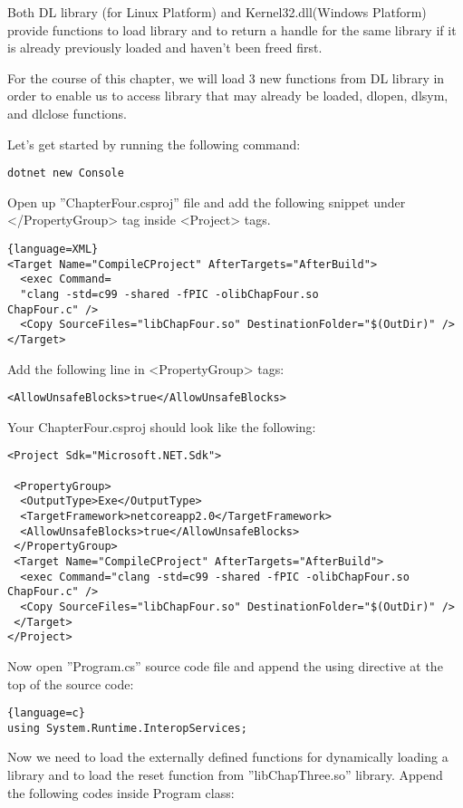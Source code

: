 Both DL library (for Linux Platform) and Kernel32.dll(Windows Platform) provide functions to load library and to return a handle for the same library if it is already previously loaded and haven't been freed first.

For the course of this chapter, we will load 3 new functions from DL library in order to enable us to access library that may already be loaded, dlopen, dlsym, and dlclose functions.

Let's get started by running the following command:

\begin{lstlisting}
dotnet new Console
\end{lstlisting}
\newpage
Open up ''ChapterFour.csproj'' file and add the following snippet under </PropertyGroup> tag inside <Project> tags.

\begin{lstlisting}{language=XML}
<Target Name="CompileCProject" AfterTargets="AfterBuild">
  <exec Command=
  "clang -std=c99 -shared -fPIC -olibChapFour.so
ChapFour.c" />
  <Copy SourceFiles="libChapFour.so" DestinationFolder="$(OutDir)" />
</Target>
\end{lstlisting}

Add the following line in <PropertyGroup> tags:

\begin{lstlisting}
<AllowUnsafeBlocks>true</AllowUnsafeBlocks>
\end{lstlisting}

Your ChapterFour.csproj should look like the following:

\begin{lstlisting}
<Project Sdk="Microsoft.NET.Sdk">

 <PropertyGroup>
  <OutputType>Exe</OutputType>
  <TargetFramework>netcoreapp2.0</TargetFramework>
  <AllowUnsafeBlocks>true</AllowUnsafeBlocks>
 </PropertyGroup>
 <Target Name="CompileCProject" AfterTargets="AfterBuild">
  <exec Command="clang -std=c99 -shared -fPIC -olibChapFour.so
ChapFour.c" />
  <Copy SourceFiles="libChapFour.so" DestinationFolder="$(OutDir)" />
 </Target>
</Project>
\end{lstlisting}
Now open ''Program.cs'' source code file and append the using directive at the top of the source code:

\begin{lstlisting}{language=c}
using System.Runtime.InteropServices;
\end{lstlisting}
\newpage
Now we need to load the externally defined functions for dynamically loading a library and to load the reset function from ''libChapThree.so'' library. Append the following codes inside Program class:

